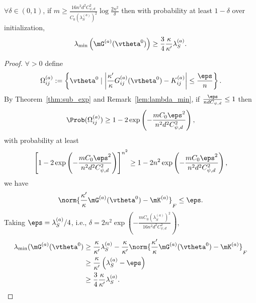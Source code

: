 \documentclass{article}
\begin{document}
\begin{lem}\label{lem:exp_a}
    $\forall\delta\in(0,1)$, if $m\geq\frac{16n^2d^2C_{\psi,d}^2}{C_0(\lambda_S^{(a)})^2}\log\frac{2n^2}{\delta}$ then with probability at least $1-\delta$ over initialization,
    \begin{equation}
        \lambda_{\text{min}}\left(\mG^{(a)}(\vtheta^0)\right)\geq\frac{3}{4}\frac{\kappa}{\kappa'}\lambda_S^{(a)}.
    \end{equation}
\end{lem}
\begin{proof}
    $\forall>0$ define
    \begin{equation}
        \Omega_{ij}^{(a)}:=\left\{\vtheta^0\mid\left|\frac{\kappa'}{\kappa}G_{ij}^{(a)}(\vtheta^0)-K_{ij}^{(a)}\right|\leq\frac{\eps}{n}\right\}.
    \end{equation}
    By Theorem~\ref{thm:sub_exp} and Remark~\ref{lem:lambda_min}, if $\frac{\eps}{ndC_{\psi,d}}\leq 1$ then
    \begin{equation}
        \Prob(\Omega_{ij}^{(a)}) \geq 1-2\exp\left(-\frac{mC_0\eps^2}{n^2d^2C^2_{\psi,d}}\right),
    \end{equation}
    with probability at least
    \begin{equation}
        \left[1-2\exp\left(-\frac{mC_0\eps^2}{n^2 d^2 C^2_{\psi,d}}\right)\right]^{n^2}\geq 1-2n^2\exp\left(-\frac{mC_0\eps^2}{n^2 d^2 C^2_{\psi,d}}\right),
    \end{equation}
    we have
    \begin{equation}
        \norm{\frac{\kappa'}{\kappa}\mG^{(a)}(\vtheta^0)-\mK^{(a)}}_F\leq\eps.
    \end{equation}
    Taking $\eps=\lambda_S^{(a)}/4$, i.e., $\delta=2n^2\exp\left(-\frac{mC_0(\lambda_S^{(a)})^2}{16n^2d^2C^2_{\psi,d}}\right)$,
    \begin{equation}
        \begin{aligned}
            \lambda_{\text{min}}(\mG^{(a)}(\vtheta^0)
             & \geq \frac{\kappa}{\kappa'}\lambda_S^{(a)}-\frac{\kappa}{\kappa'}\norm{\frac{\kappa'}{\kappa}\mG^{(a)}(\vtheta^0)-\mK^{(a)}}_F \\
             & \geq \frac{\kappa}{\kappa'}\left(\lambda_S^{(a)}-\eps\right)                                                                   \\
             & \geq\frac{3}{4}\frac{\kappa}{\kappa'}\lambda_S^{(a)}.
        \end{aligned}
    \end{equation}
\end{proof}
\end{document}

